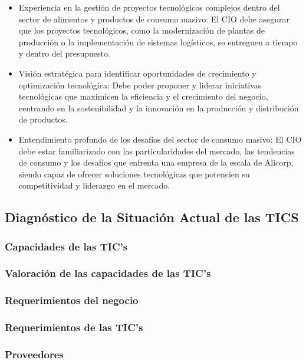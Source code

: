 \begin{itemize}
        \item Experiencia en la gestión de proyectos tecnológicos complejos dentro del sector de alimentos y productos de consumo masivo: El CIO debe asegurar que los proyectos tecnológicos, como la modernización de plantas de producción o la implementación de sistemas logísticos, se entreguen a tiempo y dentro del presupuesto. 
        \item Visión estratégica para identificar oportunidades de crecimiento y optimización tecnológica: Debe poder proponer y liderar iniciativas tecnológicas que maximicen la eficiencia y el crecimiento del negocio, centrando en la sostenibilidad y la innovación en la producción y distribución de productos. 
        \item Entendimiento profundo de los desafíos del sector de consumo masivo: El CIO debe estar familiarizado con las particularidades del mercado, las tendencias de consumo y los desafíos que enfrenta una empresa de la escala de Alicorp, siendo capaz de ofrecer soluciones tecnológicas que potencien su competitividad y liderazgo en el mercado. 
    \end{itemize}


\subsection{Diagnóstico de la Situación Actual de las TICS}
\subsubsection{Capacidades de las TIC’s }
\lipsum[1]
\subsubsection{Valoración de las capacidades de las TIC’s }
\lipsum[1]
\subsubsection{Requerimientos del negocio}
\lipsum[1]
\subsubsection{Requerimientos de las TIC’s}
\lipsum[1]
\subsubsection{Proveedores }
\lipsum[1]

